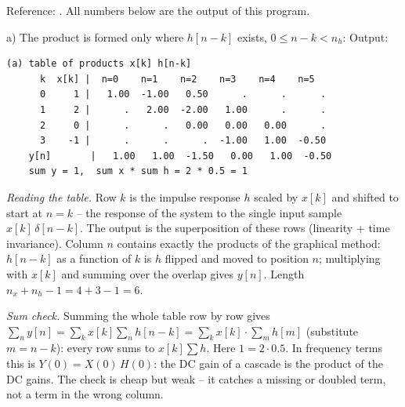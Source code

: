 \begin{solution}
Reference: . All numbers
below are the output of this program.

a) The product is formed only where $h[n-k]$ exists, $0\le n-k<n_h$:
Output:
\begin{lstlisting}[style=shell,numbers=none]
(a) table of products x[k] h[n-k]
      k  x[k] |  n=0    n=1    n=2    n=3    n=4    n=5
      0     1 |   1.00  -1.00   0.50      .      .      .
      1     2 |      .   2.00  -2.00   1.00      .      .
      2     0 |      .      .   0.00   0.00   0.00      .
      3    -1 |      .      .      .  -1.00   1.00  -0.50
    y[n]       |   1.00   1.00  -1.50   0.00   1.00  -0.50
    sum y = 1,  sum x * sum h = 2 * 0.5 = 1
\end{lstlisting}
\emph{Reading the table.} Row $k$ is the impulse response $h$ scaled by $x[k]$
and shifted to start at $n=k$ -- the response of the system to the single
input sample $x[k]\,\delta[n-k]$. The output is the superposition of these
rows (linearity + time invariance). Column $n$ contains exactly the products
of the graphical method: $h[n-k]$ as a function of $k$ is $h$ flipped and
moved to position $n$; multiplying with $x[k]$ and summing over the overlap
gives $y[n]$. Length $n_x+n_h-1=4+3-1=6$.

\emph{Sum check.} Summing the whole table row by row gives
$\sum_n y[n]=\sum_k x[k]\sum_n h[n-k]=\sum_k x[k]\cdot\sum_m h[m]$ (substitute
$m=n-k$): every row sums to $x[k]\sum h$. Here $1=2\cdot0.5$. In frequency
terms this is $Y(0)=X(0)\,H(0)$: the DC gain of a cascade is the product of
the DC gains. The check is cheap but weak -- it catches a missing or doubled
term, not a term in the wrong column.


\end{solution}
